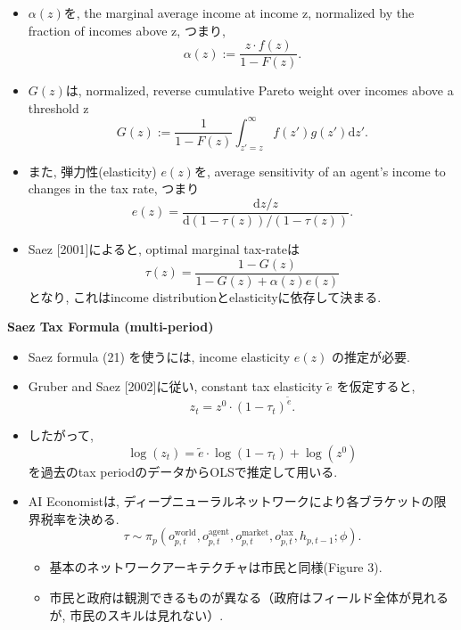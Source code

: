 \documentclass[unicode,aspectratio=169,11pt]{beamer}
\begin{document}
\begin{frame}{}{}
    \begin{itemize}
        \item $\alpha(z)$を, the marginal average income at income z, normalized by the fraction of incomes above z, つまり,
        \[ \alpha(z) := \frac{z \cdot f(z)}{1 - F(z)}. \tag{18}\]
        \item $G(z)$は, normalized, reverse cumulative Pareto weight over incomes above a threshold z
        \[ G(z) := \frac{1}{1 - F(z)}\int_{z' = z}^\infty f(z')g(z') \mathrm{d}z'. \tag{19}\]
        \item また, 弾力性(elasticity) $e(z)$を, average sensitivity of an agent’s income to changes in the tax rate, つまり
        \[e(z) = \frac{\mathrm{d}z / z}{\mathrm{d}(1 - \tau(z))/(1-\tau(z))}. \tag{20}\]
        \item Saez [2001]によると, optimal marginal tax-rateは
        \[ \tau(z) = \frac{1 - G(z)}{1 - G(z) + \alpha(z) e(z)} \tag{21}\]
        となり, これはincome distributionとelasticityに依存して決まる.
    \end{itemize}
\end{frame}

\begin{frame}{}{}
{\bf Saez Tax Formula (multi-period)}
\begin{itemize}
    \item Saez formula (21) を使うには, income elasticity $e(z)$ の推定が必要.
    \item Gruber and Saez [2002]に従い, constant tax elasticity $\tilde{e}$ を仮定すると, 
    \[ z_t = z^0 \cdot (1- \tau_t)^{\tilde{e}}. \tag{22} \]
    \item したがって, 
    \[ \log(z_t) = \tilde{e} \cdot \log(1 - \tau_t) + \log(z^0) \tag{23} \]
    を過去のtax periodのデータからOLSで推定して用いる.
\end{itemize}
\end{frame}

\begin{frame}{}{}
    \begin{itemize}
        \item AI Economistは, ディープニューラルネットワークにより各ブラケットの限界税率を決める.
        \[ \tau \sim \pi_p\left( o^{\mathrm{world}}_{p,t}, o^{\mathrm{agent}}_{p,t}, o^{\mathrm{market}}_{p,t}, o^{\mathrm{tax}}_{p,t}, h_{p, t-1} ; \phi \right). \tag{24} \]
        \begin{itemize}
            \item 基本のネットワークアーキテクチャは市民と同様(Figure 3).
            \item 市民と政府は観測できるものが異なる（政府はフィールド全体が見れるが, 市民のスキルは見れない）.
        \end{itemize}
    \end{itemize}
\end{frame}
\end{document}
